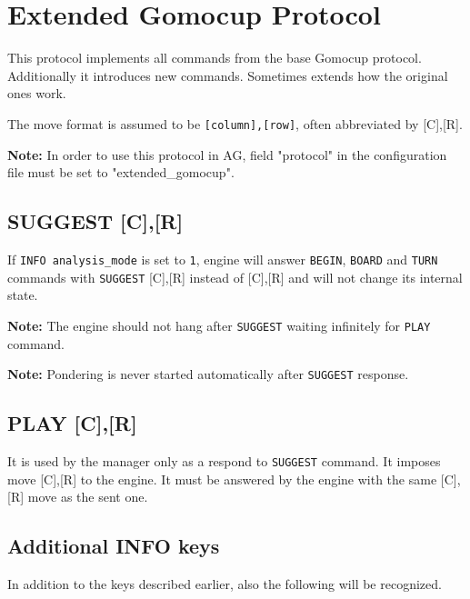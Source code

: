 \documentclass[12pt,a4paper]{article}
\begin{document}
\section{Extended Gomocup Protocol}
This protocol implements all commands from the base Gomocup protocol. Additionally it introduces new commands. Sometimes extends how the original ones work.

The move format is assumed to be \texttt{[column],[row]}, often abbreviated by [C],[R].

\textbf{Note:} In order to use this protocol in AG, field "protocol" in the configuration file must be set to "extended{\_}gomocup".

\subsection{SUGGEST [C],[R]}
\label{cmd_suggest}
If \texttt{INFO analysis{\_}mode} is set to \texttt{1}, engine will answer \texttt{BEGIN}, \texttt{BOARD} and \texttt{TURN} commands with \texttt{SUGGEST} [C],[R] instead of [C],[R] and will not change its internal state.

\textbf{Note:} The engine should not hang after \texttt{SUGGEST} waiting infinitely for \texttt{PLAY} command.

\textbf{Note:} Pondering is never started automatically after \texttt{SUGGEST} response.


\subsection{PLAY [C],[R]}
\label{cmd_play}
It is used by the manager only as a respond to \texttt{SUGGEST} command. It imposes move [C],[R] to the engine. It must be answered by the engine with the same [C],[R] move as the sent one.


\subsection{Additional INFO keys}
\label{cmd_info_extension1}
In addition to the keys described earlier, also the following will be recognized.
\end{document}
